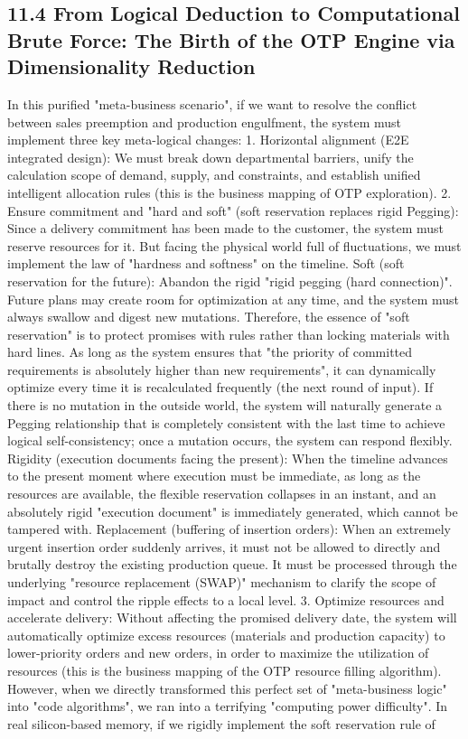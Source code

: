 \documentclass[11pt,a4paper]{article}
\begin{document}
\subsection*{11.4 From Logical Deduction to Computational Brute Force: The Birth of the OTP Engine via Dimensionality Reduction}


In this purified "meta-business scenario", if we want to resolve the conflict between sales preemption and production engulfment, the system must implement three key meta-logical changes: 1. Horizontal alignment (E2E integrated design): We must break down departmental barriers, unify the calculation scope of demand, supply, and constraints, and establish unified intelligent allocation rules (this is the business mapping of OTP exploration). 2. Ensure commitment and "hard and soft" (soft reservation replaces rigid Pegging): Since a delivery commitment has been made to the customer, the system must reserve resources for it. But facing the physical world full of fluctuations, we must implement the law of "hardness and softness" on the timeline. Soft (soft reservation for the future): Abandon the rigid "rigid pegging (hard connection)". Future plans may create room for optimization at any time, and the system must always swallow and digest new mutations. Therefore, the essence of "soft reservation" is to protect promises with rules rather than locking materials with hard lines. As long as the system ensures that "the priority of committed requirements is absolutely higher than new requirements", it can dynamically optimize every time it is recalculated frequently (the next round of input). If there is no mutation in the outside world, the system will naturally generate a Pegging relationship that is completely consistent with the last time to achieve logical self-consistency; once a mutation occurs, the system can respond flexibly. Rigidity (execution documents facing the present): When the timeline advances to the present moment where execution must be immediate, as long as the resources are available, the flexible reservation collapses in an instant, and an absolutely rigid "execution document" is immediately generated, which cannot be tampered with. Replacement (buffering of insertion orders): When an extremely urgent insertion order suddenly arrives, it must not be allowed to directly and brutally destroy the existing production queue. It must be processed through the underlying "resource replacement (SWAP)" mechanism to clarify the scope of impact and control the ripple effects to a local level. 3. Optimize resources and accelerate delivery: Without affecting the promised delivery date, the system will automatically optimize excess resources (materials and production capacity) to lower-priority orders and new orders, in order to maximize the utilization of resources (this is the business mapping of the OTP resource filling algorithm). However, when we directly transformed this perfect set of "meta-business logic" into "code algorithms", we ran into a terrifying "computing power difficulty". In real silicon-based memory, if we rigidly implement the soft reservation rule of 
\end{document}

